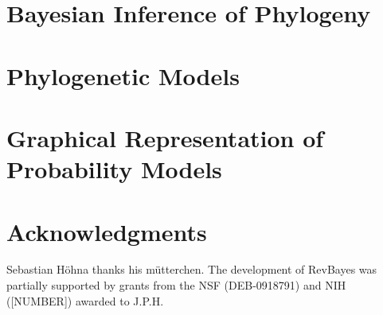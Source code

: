 \documentclass{article}
\begin{document}
\section*{Bayesian Inference of Phylogeny}

\section*{Phylogenetic Models}

\section*{Graphical Representation of Probability Models}

\section*{Acknowledgments}

Sebastian H\"ohna thanks his m\"utterchen.
The development of RevBayes was partially supported by grants from the NSF (DEB-0918791) and NIH ([NUMBER]) awarded to J.P.H.



\newpage
\end{document}
